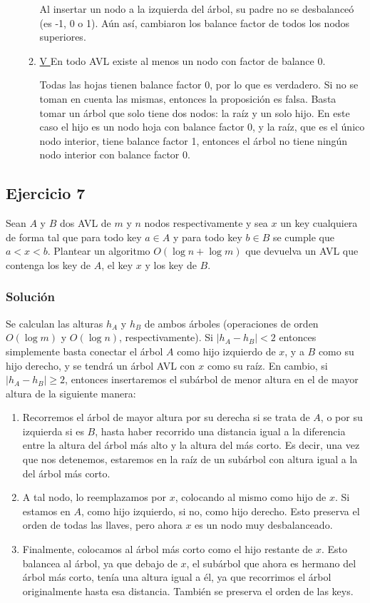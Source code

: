 \documentclass{article}
\begin{document}
\begin{enumerate}
\begin{enumerate}
Al insertar un nodo a la izquierda del árbol, su padre no se desbalanceó (es -1, 0 o 1). Aún así, cambiaron los balance factor de todos los nodos superiores.


\item \underline{ V } En todo AVL existe al menos un nodo con factor de balance 0.

Todas las hojas tienen balance factor 0, por lo que es verdadero. Si no se toman en cuenta las mismas, entonces la proposición es falsa. Basta tomar un árbol que solo tiene dos nodos: la raíz y un solo hijo. En este caso el hijo es un nodo hoja con balance factor 0, y la raíz, que es el único nodo interior, tiene balance factor 1, entonces el árbol no tiene ningún nodo interior con balance factor 0.

\end{enumerate}
\end{enumerate}


\subsection*{Ejercicio 7}
Sean $A$ y $B$ dos AVL de $m$ y $n$ nodos respectivamente y sea $x$ un key cualquiera de forma tal que para todo key $a\in A$ y para todo key $b\in B$ se cumple que $a < x < b$. Plantear un algoritmo $O(\log n + \log m)$ que devuelva un AVL que contenga los key de $A$, el key $x$ y los key de $B$.
\subsubsection*{Solución}
Se calculan las alturas $h_A$ y $h_B$ de ambos árboles (operaciones de orden $O(\log m)$ y $O(\log n)$, respectivamente). Si $|h_A-h_B|<2$ entonces simplemente basta conectar el árbol $A$ como hijo izquierdo de $x$, y a $B$ como su hijo derecho, y se tendrá un árbol AVL con $x$ como su raíz. En cambio, si $|h_A-h_B|\geq 2$, entonces insertaremos el subárbol de menor altura en el de mayor altura de la siguiente manera:
\begin{enumerate}
    \item Recorremos el árbol de mayor altura por su derecha si se trata de $A$, o por su izquierda si es $B$, hasta haber recorrido una distancia igual a la diferencia entre la altura del árbol más alto y la altura del más corto. Es decir, una vez que nos detenemos, estaremos en la raíz de un subárbol con altura igual a la del árbol más corto.
    \item A tal nodo, lo reemplazamos por $x$, colocando al mismo como hijo de $x$. Si estamos en $A$, como hijo izquierdo, si no, como hijo derecho. Esto preserva el orden de todas las llaves, pero ahora $x$ es un nodo muy desbalanceado.
    \item Finalmente, colocamos al árbol más corto como el hijo restante de $x$. Esto balancea al árbol, ya que debajo de $x$, el subárbol que ahora es hermano del árbol más corto, tenía una altura igual a él, ya que recorrimos el árbol originalmente hasta esa distancia. También se preserva el orden de las keys.
\end{enumerate}
\end{document}
